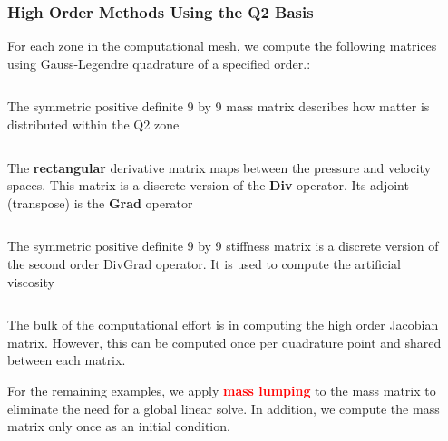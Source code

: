 \documentclass[8pt,xcolor=svgnames]{beamer}
\begin{document}
\begin{frame}
 \frametitle{High Order Methods Using the Q2 Basis}
 For each zone in the computational mesh, we compute the following matrices using Gauss-Legendre quadrature of a specified order.:
 \medskip
 \begin{columns}
  \begin{column}{0.3\textwidth}
   \tiny{The symmetric positive definite 9 by 9 mass matrix describes how matter is distributed within the Q2 zone}
  \end{column}
  \begin{column}{0.5\textwidth}
  \end{column}
 \end{columns}
 
 \bigskip
 \begin{columns}
  \begin{column}{0.3\textwidth}
   \tiny{The \textbf{rectangular} derivative matrix maps between the pressure and velocity spaces. This matrix is a discrete version of the \textbf{Div} operator. Its adjoint (transpose) is the \textbf{Grad} operator}
  \end{column}
  \begin{column}{0.5\textwidth}
  \end{column}
 \end{columns}
 
 \bigskip
 \begin{columns}
  \begin{column}{0.3\textwidth}
   \tiny{The symmetric positive definite 9 by 9 stiffness matrix is a discrete version of the second order DivGrad operator. It is used to compute the artificial viscosity}
  \end{column}
  \begin{column}{0.5\textwidth}
  \end{column}
 \end{columns}
 
 \bigskip
 The bulk of the computational effort is in computing the high order Jacobian matrix. However, this can be computed once per quadrature point and shared between each matrix.
 
 \medskip
 \begin{block}{}
  For the remaining examples, we apply \textcolor{red}{\textbf{mass lumping}} to the mass matrix to eliminate the need for a global linear solve. In addition, we compute the mass matrix only once as an initial condition.
 \end{block}


\end{frame}
\end{document}
